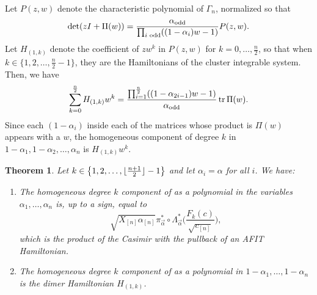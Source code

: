 \documentclass[pdftex]{sigma}
\numberwithin{equation}{section}
\newtheorem{Theorem}{Theorem}[section]
\DeclarePairedDelimiter\floor{\lfloor}{\rfloor}
\newcommand{\la}{\label}
\DeclareMathOperator{\tr}{tr}
\begin{document}
	
	Let $P(z,w)$ denote the characteristic polynomial of $\Gamma_n$, normalized so that
	\[
	\det (zI + \Pi(w))=\frac{ \alpha_{{\rm odd}}}{\prod_{i \text{ odd} }^{} ((1-\alpha_{i})w-1)} P(z,w).
	\]
	Let $H_{(1,k)}$ denote the coefficient of $z w^k$ in $P(z,w)$ for $k=0,\dots,\frac n 2 $, so that when $k \in \bigl\{1,2,\dots,\allowbreak\frac n 2 -1\bigr\}$, they are the Hamiltonians of the cluster integrable system. Then, we have
	\begin{align*}
		\sum_{k=0}^{\frac n 2} H_{(1,k)} w^k = \frac{\prod_{i=1}^{\frac n 2} ((1-\alpha_{2i-1})w-1)} {\alpha_{{\rm odd}}} \tr \Pi(w).
	\end{align*}
	Since each $(1-\alpha_i)$ inside each of the matrices whose product is $\Pi(w)$ appears with a $w$, the homogeneous component of degree $k$ in $1-\alpha_1,1-\alpha_2,\dots,\alpha_{n}$ is $H_{(1,k)} w^{k}$.
	\begin{Theorem}%
		Let $k \in \bigl\{1,2,\dots,\floor{\frac{n+1}{2} }-1\bigr\}$ and let $\alpha_i=\alpha$ for all $i$. We have:
		\begin{enumerate}\itemsep=0pt
			\item[$1.$] The homogeneous degree $k$ component of  as a polynomial in the variables $\alpha_1,\dots,\alpha_n$ is, up to a sign, equal to
\[
\sqrt{X_{[n]} \alpha_{[n]}} \pi_{\vec \alpha}^* \circ \Lambda_{\vec \alpha}^*\biggl(\frac{F_k(c)}{\sqrt{c_{[n]}}}\biggr),
\]
which is the product of the Casimir  with the pullback of an AFIT Hamiltonian.
			\item[$2.$] The homogeneous degree $k$ component of  as a polynomial in $1-\alpha_1,\dots,1-\alpha_n$ is the dimer Hamiltonian $H_{(1,k)}$.
		\end{enumerate}
	\end{Theorem}
	
	
	
\end{document}
